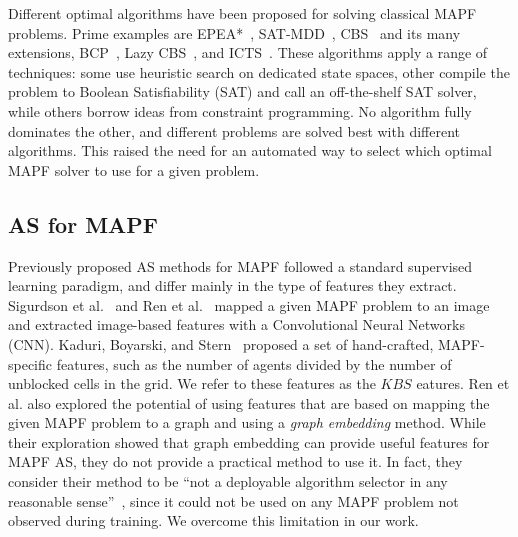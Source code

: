 \documentclass{ecai}
\newcommand{\Carmel}[1]{}
\newcommand{\Roni}[1]{}
\newcommand{\kaduri}[1]{\ensuremath{\textit{KBS}}\xspace}
\begin{document}
Different optimal algorithms have been proposed for solving classical MAPF problems. 
Prime examples are EPEA*~\cite{goldenberg2014enhanced}, SAT-MDD~\cite{anOptimization2010surynek}, CBS~\cite{sharon2015conflict,felner2018adding} and its many extensions, BCP~\cite{lam2022branch}, Lazy CBS~\cite{gange2019lazy}, and ICTS~\cite{sharon2013increasing}. These algorithms apply a range of techniques: some use heuristic search on dedicated state spaces, other compile the problem to Boolean Satisfiability (SAT) and call an off-the-shelf SAT solver, while others borrow ideas from constraint programming. 
No algorithm fully dominates the other, and different  problems are solved best with different algorithms. This raised the need for an automated way to select which optimal MAPF solver to use for a given problem. 




\subsection{AS for MAPF}



Previously proposed AS methods for MAPF followed a standard supervised learning paradigm, 
and differ mainly in the type of features they extract. 
Sigurdson et al.~\cite{sigurdson2019automatic} and Ren et al.~\cite{ren2021mapfast} mapped a given MAPF problem to an image and extracted image-based features with a Convolutional Neural Networks (CNN). 
Kaduri, Boyarski, and Stern~\cite{kaduri2020algorithm} proposed a set of hand-crafted, MAPF-specific features, such as the number of agents divided
by the number of unblocked cells in the grid. 
We refer to these features as the \kaduri features. 
Ren et al. also explored the potential of using features that are based on mapping the given MAPF problem to a graph and using a \emph{graph embedding} method. 
While their exploration showed that graph embedding can provide useful features for MAPF AS, they do not provide a practical method to use it. In fact, they consider their method to be ``not a deployable algorithm selector in any reasonable sense''~\cite{ren2021mapfast}, since it could not be used on any MAPF problem not observed during training. 
We overcome this limitation in our work.  
 \Carmel{this sentence is very misleading, for example Kaduri method can be deployed it can be used on problems/maps that are not part of train}\Roni{But this sentence is about the G2V method. They wrote it themselves (it's a quote). I rephrased a bit after your comment to make it clearer. Let me know if you're happy or not with it.}
\end{document}
